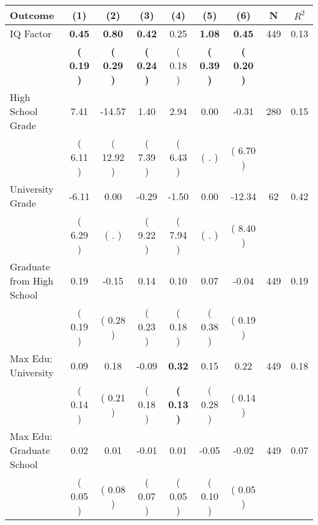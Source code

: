 \begin{tabular}{lcccccccc}
\toprule
 \textbf{Outcome} & \textbf{(1)} & \textbf{(2)} & \textbf{(3)} & \textbf{(4)} & \textbf{(5)} & \textbf{(6)} & \textbf{N} & \textbf{$ R^2$} \\
\midrule
IQ Factor & \textbf{     0.45} & \textbf{     0.80} & \textbf{     0.42} &      0.25 & \textbf{     1.08} & \textbf{     0.45} & 449 &       0.13 \\ 
 & \textbf{(     0.19 )} & \textbf{(     0.29 )} & \textbf{(     0.24 )} & (     0.18 ) & \textbf{(     0.39 )} & \textbf{(     0.20 )} & \\
High School Grade &      7.41 &    -14.57 &      1.40 &      2.94 &      0.00 &     -0.31 & 280 &       0.15 \\ 
 & (     6.11 ) & (    12.92 ) & (     7.39 ) & (     6.43 ) & (        . ) & (     6.70 ) & \\
University Grade &     -6.11 &      0.00 &     -0.29 &     -1.50 &      0.00 &    -12.34 & 62 &       0.42 \\ 
 & (     6.29 ) & (        . ) & (     9.22 ) & (     7.94 ) & (        . ) & (     8.40 ) & \\
Graduate from High School &      0.19 &     -0.15 &      0.14 &      0.10 &      0.07 &     -0.04 & 449 &       0.19 \\ 
 & (     0.19 ) & (     0.28 ) & (     0.23 ) & (     0.18 ) & (     0.38 ) & (     0.19 ) & \\
Max Edu: University &      0.09 &      0.18 &     -0.09 & \textbf{     0.32} &      0.15 &      0.22 & 449 &       0.18 \\ 
 & (     0.14 ) & (     0.21 ) & (     0.18 ) & \textbf{(     0.13 )} & (     0.28 ) & (     0.14 ) & \\
Max Edu: Graduate School &      0.02 &      0.01 &     -0.01 &      0.01 &     -0.05 &     -0.02 & 449 &       0.07 \\ 
 & (     0.05 ) & (     0.08 ) & (     0.07 ) & (     0.05 ) & (     0.10 ) & (     0.05 ) & \\
\bottomrule
\end{tabular}
